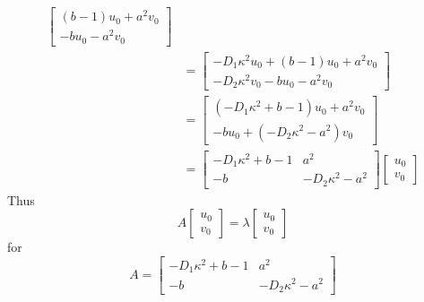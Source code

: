 \documentclass[12pt]{article}
\begin{document}
\begin{enumerate}
\begin{align*}
\begin{bmatrix}
            (b-1)u_0 + a^2v_0\\
            -bu_0 -a^2v_0
        \end{bmatrix}\\
        &= \begin{bmatrix}
            -D_1 \kappa^2 u_0 + (b-1)u_0 + a^2v_0\\
            -D_2 \kappa^2 v_0 -bu_0 -a^2v_0
        \end{bmatrix}\\
        &= \begin{bmatrix}
            (-D_1\kappa^2 + b - 1)u_0 + a^2 v_0\\
            -bu_0 + (-D_2\kappa^2 - a^2)v_0
        \end{bmatrix}\\
        &= \begin{bmatrix}
            -D_1\kappa^2 + b - 1 & a^2\\
            -b & -D_2\kappa^2 - a^2
        \end{bmatrix}\begin{bmatrix}
            u_0\\
            v_0
        \end{bmatrix}
    \end{align*}
    Thus 
    \[A \begin{bmatrix}
        u_0\\v_0
    \end{bmatrix} = \lambda \begin{bmatrix}
        u_0\\v_0
    \end{bmatrix}\]
    for 
    \[\boxed{A = \begin{bmatrix}
        -D_1\kappa^2 + b - 1 & a^2\\
        -b & -D_2\kappa^2 - a^2
    \end{bmatrix}}\]
    \color{black}
\end{enumerate}
\end{document}
